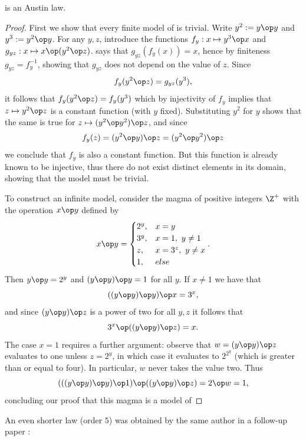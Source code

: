 \begin{theorem}
  \leanok
  \label{kis-thm}
   is an Austin law.
\end{theorem}

\begin{proof} \leanok  First we show that every finite model of  is trivial.  Write $y^2 := y \op y$ and $y^3 := y^2 \op y$.  For any $y,z$, introduce the functions ${f_y: x \mapsto y^3 \op x}$ and ${g_{yz}: x \mapsto x \op (y^2 \op z)}$.   says that $g_{yz}(f_y(x))=x$, hence by finiteness $g_{yz}=f_y^{-1}$, showing that $g_{yz}$ does not depend on the value of $z$.  Since
$$ f_y(y^2 \op z) = g_{yz}(y^3),$$
it follows that $f_y(y^2 \op z)=f_y(y^3)$ which by injectivity of $f_y$ implies that $z\mapsto y^2 \op z$ is a constant function (with $y$ fixed).  Substituting $y^2$ for $y$ shows that the same is true for $z\mapsto (y^2 \op y^2) \op z$, and since
$$ f_y(z) = (y^2 \op y) \op z = (y^2 \op y^2) \op z$$
we conclude that $f_y$ is also a constant function.  But this function is already known to be injective, thus there do not exist distinct elements in its domain, showing that the model must be trivial.

To construct an infinite model, consider the magma of positive integers $\Z^+$ with the operation $x \op y$ defined by
$$
x \op y =
\begin{cases}
2^y, & x=  y            \\
3^y, & x=  1,\ y \neq 1 \\
  z, & x=3^z,\ y \neq x \\
  1, & else
\end{cases}.
$$
Then $y \op y = 2^y$ and $(y \op y) \op y = 1$ for all $y$.  If $x\neq 1$ we have that
$$ ((y \op y) \op y) \op x = 3^x, $$
and since $(y \op y) \op z$ is a power of two for all $y, z$ it follows that
$$ 3^x \op ((y \op y) \op z) = x. $$
The case $x=1$ requires a further argument: observe that $w = (y \op y) \op z$ evaluates to one unless $z = 2^y$, in which case it evaluates to $2^{2^y}$ (which is greater than or equal to four).  In particular, $w$ never takes the value two.  Thus
$$ (((y \op y) \op y) \op 1) \op ((y \op y) \op z) = 2 \op w = 1, $$
concluding our proof that this magma is a model of 
\end{proof}

An even shorter law (order $5$) was obtained by the same author in a follow-up paper \cite{Kisielewicz2}:

